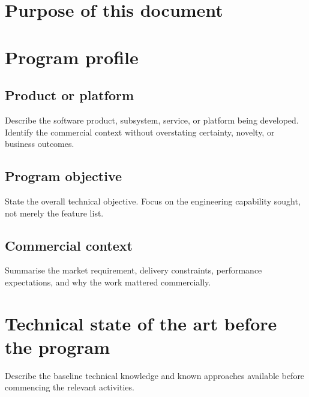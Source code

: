 \documentclass[11pt]{article}
\begin{document}
\RDTitlePage
\tableofcontents
\clearpage

\section{Purpose of this document}


\section{Program profile}
\RDMetaTable

\subsection{Product or platform}
Describe the software product, subsystem, service, or platform being developed. Identify the commercial context without overstating certainty, novelty, or business outcomes.

\subsection{Program objective}
State the overall technical objective. Focus on the engineering capability sought, not merely the feature list.

\subsection{Commercial context}
Summarise the market requirement, delivery constraints, performance expectations, and why the work mattered commercially.

\section{Technical state of the art before the program}
Describe the baseline technical knowledge and known approaches available before commencing the relevant activities.
\end{document}
